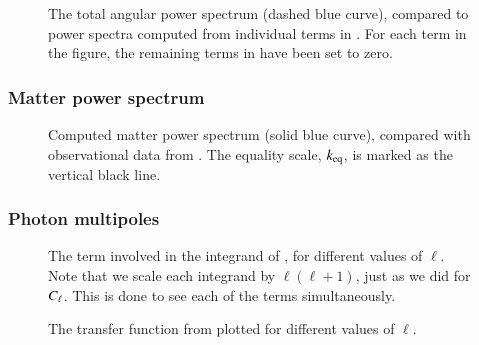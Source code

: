 \begin{figure}[ht!]
    \caption{The total angular power spectrum (dashed blue curve), compared to power spectra computed from individual terms in . For each term in the figure, the remaining terms in  have been set to zero.}
    \label{fig:M4:results:cells_components}
\end{figure}

\subsubsection{Matter power spectrum} \label{sssec:M4:results:matter_power_spectrum}
\begin{figure}[ht!]
    \caption{Computed matter power spectrum (solid blue curve), compared with observational data from . The equality scale, $k_\mathrm{eq}$, is marked as the vertical black line.}
    \label{fig:M4:results:matterPS_nk1000}
\end{figure}




\subsubsection{Photon multipoles} \label{sssec:M4:results:photons_multipoles}
\begin{figure}[ht!]
    \caption{The term involved in the integrand of , for different values of $\ell$. Note that we scale each integrand by $\ell(\ell+1)$, just as we did for $C_\ell$. This is done to see each of the terms simultaneously.}
    \label{fig:M4:results:integrand_thetas}
\end{figure}


\begin{figure}[ht!]
    \caption{The transfer function from  plotted for different values of $\ell$.}
    \label{fig:M4:results:thetas}
\end{figure}